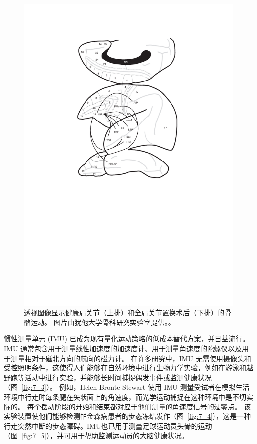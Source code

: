 \begin{figure}[!htb]
	\centering
	\includegraphics[width=1.0\linewidth]{chap7/7_2}
	\caption{透视图像显示健康肩关节（上排）和全肩关节置换术后（下排）的骨骼运动。
		图片由犹他大学骨科研究实验室提供。。 \label{fig:7_2}}
\end{figure}


惯性测量单元 (IMU) 已成为现有量化运动策略的低成本替代方案，并日益流行。
IMU 通常包含用于测量线性加速度的加速度计、用于测量角速度的陀螺仪以及用于测量相对于磁北方向的航向的磁力计。
在许多研究中，IMU 无需使用摄像头和受控照明条件，这使得人们能够在自然环境中进行生物力学实验，例如在游泳和越野跑等活动中进行实验，并能够长时间捕捉偶发事件或监测健康状况（图~\ref{fig:7_3}）。
例如，Helen Bronte-Stewart 使用 IMU 测量受试者在模拟生活环境中行走时每条腿在矢状面上的角速度，而光学运动捕捉在这种环境中是不切实际的。
每个摆动阶段的开始和结束都对应于他们测量的角速度信号的过零点。
该实验装置使他们能够检测帕金森病患者的步态冻结发作（图~\ref{fig:7_4}），这是一种行走突然中断的步态障碍。IMU也已用于测量足球运动员头骨的运动（图~\ref{fig:7_5}），并可用于帮助监测运动员的大脑健康状况。


